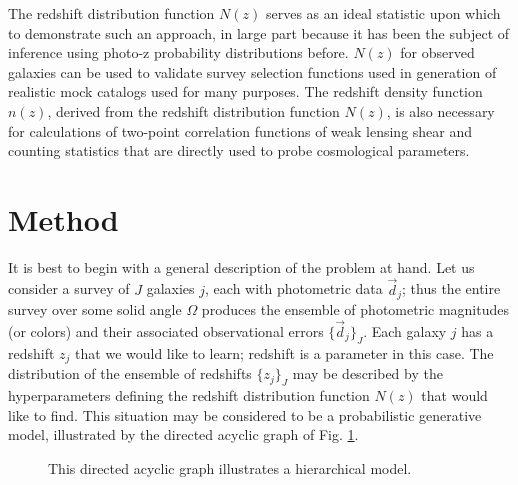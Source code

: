 \documentclass[preprint]{aastex}
\begin{document}
The redshift distribution function $N(z)$ serves as an ideal statistic upon 
which to demonstrate such an approach, in large part because it has been the 
subject of inference using photo-z probability distributions before.  
\citep{Sheldon2012, Kelly2014, Benjamin2013, Bonnett2015a, Viironen2015, 
Asorey2016}  $N(z)$ for observed galaxies can be used to validate survey 
selection functions used in generation of realistic mock catalogs used for many 
purposes.  \citep{Norberg2002}  The redshift density function $n(z)$, derived 
from the redshift distribution function $N(z)$, is also necessary for 
calculations of two-point correlation functions of weak lensing shear and 
counting statistics that are directly used to probe cosmological parameters.  
\citep{Masters2015}

\clearpage
\section{Method}
\label{sec:meth}

It is best to begin with a general description of the problem at hand.  Let us 
consider a survey of $J$ galaxies $j$, each with photometric data 
$\vec{d}_{j}$; thus the entire survey over some solid angle $\Omega$ produces 
the ensemble of photometric magnitudes (or colors) and their associated 
observational errors $\{\vec{d}_{j}\}_{J}$.  Each galaxy $j$ has a redshift 
$z_{j}$ that we would like to learn; redshift is a parameter in this case.  The 
distribution of the ensemble of redshifts $\{z_{j}\}_{J}$ may be described by 
the hyperparameters defining the redshift distribution function $N(z)$ that 
would like to find.  This situation may be considered to be a probabilistic 
generative model, illustrated by the directed acyclic graph of Fig. 
\ref{fig:flow}.  

\begin{figure}
\vspace{0.5cm}
\begin{center}
\caption{This directed acyclic graph illustrates a hierarchical model.}
\label{fig:flow}
\end{center}
\end{figure}
\end{document}
